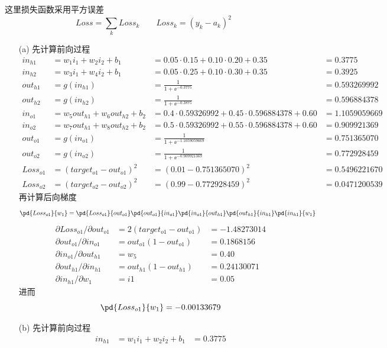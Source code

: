 \documentclass[a4paper, 11pt]{article}
\newcommand{\ipd}[2]{\partial #1/\partial #2}
\begin{document}
\begin{answer}
    这里损失函数采用平方误差
    \[Loss=\sum_{k}Loss_k\qquad Loss_k=(y_k-a_k)^2\]
\begin{itemize}
    \item[(a)] 先计算前向过程
    \[\begin{array}{llll}
        in_{h1} &= w_1 i_1 + w_2 i_2 + b_1 &= 0.05\cdot 0.15 + 0.10 \cdot 0.20 + 0.35 &= 0.3775\\
        in_{h2} &= w_3 i_1 + w_4 i_2 + b_1 &= 0.05\cdot 0.25 + 0.10 \cdot 0.30 + 0.35 &= 0.3925\\
        out_{h1} &= g(in_{h1}) &= \frac{1}{1+\ee^{-0.3775}} &=0.593269992\\
        out_{h2} &= g(in_{h2}) &= \frac{1}{1+\ee^{-0.3875}} &=0.596884378\\
        in_{o1} &= w_5 out_{h1} + w_6 out_{h2} +b_2 &= 0.4\cdot 0.59326992 + 0.45\cdot 0.596884378 + 0.60 &= 1.1059059669\\
        in_{o2} &= w_7 out_{h1} + w_8 out_{h2} +b_2 &= 0.5\cdot 0.59326992 + 0.55\cdot 0.596884378 + 0.60 &= 0.909921369\\
        out_{o1} &= g(in_{o1}) &=\frac{1}{1+\ee^{-1.1059059669}} &= 0.751365070\\
        out_{o2} &= g(in_{o2}) &=\frac{1}{1+\ee^{-0.909921369}} &= 0.772928459\\
        Loss_{o1} &= (target_{o1}-out_{o1})^2 &= (0.01-0.751365070)^2 &=0.5496221670\\
        Loss_{o2} &= (target_{o2}-out_{o2})^2 &= (0.99-0.772928459)^2 &=0.0471200539
    \end{array}\]
    再计算后向梯度
    \[\pd{Loss_{o1}}{w_1}=\pd{Loss_{o1}}{out_{o1}}\pd{out_{o1}}{in_{o1}}\pd{in_{o1}}{out_{h1}}\pd{out_{h1}}{in_{h1}}\pd{in_{h1}}{w_1}\]
    \[\begin{array}{lll}
        \ipd{Loss_{o1}}{out_{o1}}&=2(target_{o1}-out_{o1})&=-1.48273014\\
        \ipd{out_{o1}}{in_{o1}}&=out_{o1}(1-out_{o1})&=0.1868156\\
        \ipd{in_{o1}}{out_{h1}}&=w_5&=0.40\\
        \ipd{out_{h1}}{in_{h1}}&=out_{h1}(1-out_{h1})&=0.24130071\\
        \ipd{in_{h1}}{w_1}&=i1&=0.05
    \end{array}\]
    进而
    \[\pd{Loss_{o1}}{w_1}=-0.00133679\]
    \item[(b)] 先计算前向过程
    \[\begin{array}{lll}
        in_{h1} &= w_1 i_1 + w_2 i_2 + b_1 &= 0.3775\\

\end{array}\]
\end{itemize}
\end{answer}
\end{document}
